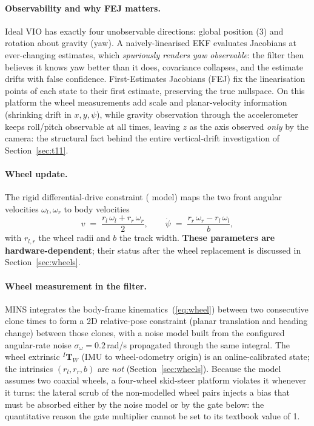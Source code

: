 \paragraph{Observability and why FEJ matters.} Ideal VIO has exactly four
unobservable directions: global position (3) and rotation about gravity
(yaw). A naively-linearised EKF evaluates Jacobians at ever-changing
estimates, which \emph{spuriously renders yaw observable}: the filter then
believes it knows yaw better than it does, covariance collapses, and the
estimate drifts with false confidence. First-Estimates Jacobians (FEJ) fix
the linearisation points of each state to their first estimate, preserving
the true nullspace. On this platform the wheel measurements add scale and
planar-velocity information (shrinking drift in $x, y, \psi$), while gravity
observation through the accelerometer keeps roll/pitch observable at all
times, leaving $z$ as the axis observed \emph{only} by the camera: the
structural fact behind the entire vertical-drift investigation of
Section~\ref{sec:t11}.

\paragraph{Wheel update.} The rigid differential-drive constraint
( model) maps the two front angular velocities
$\omega_l, \omega_r$ to body velocities
\begin{equation}
v \;=\; \frac{r_l\,\omega_l + r_r\,\omega_r}{2},
\qquad
\dot{\psi} \;=\; \frac{r_r\,\omega_r - r_l\,\omega_l}{b},
\label{eq:wheel}
\end{equation}
with $r_{l,r}$ the wheel radii and $b$ the track width. \textbf{These
parameters are hardware-dependent}; their status after the wheel replacement
is discussed in Section~\ref{sec:wheels}.

\paragraph{Wheel measurement in the filter.} MINS integrates the body-frame
kinematics~(\ref{eq:wheel}) between two consecutive clone times to form a
2D relative-pose constraint (planar translation and heading change) between
those clones, with a noise model built from the configured angular-rate
noise $\sigma_\omega = 0.2$\,rad/s propagated through the same integral. The
wheel extrinsic ${}^{I}\mathbf{T}_{W}$ (IMU to wheel-odometry origin) is an
online-calibrated state; the intrinsics $(r_l, r_r, b)$ are \emph{not}
(Section~\ref{sec:wheels}). Because the model assumes two coaxial wheels, a
four-wheel skid-steer platform violates it whenever it turns: the lateral
scrub of the non-modelled wheel pairs injects a bias that must be absorbed
either by the noise model or by the gate below: the quantitative reason
the gate multiplier cannot be set to its textbook value of 1.

